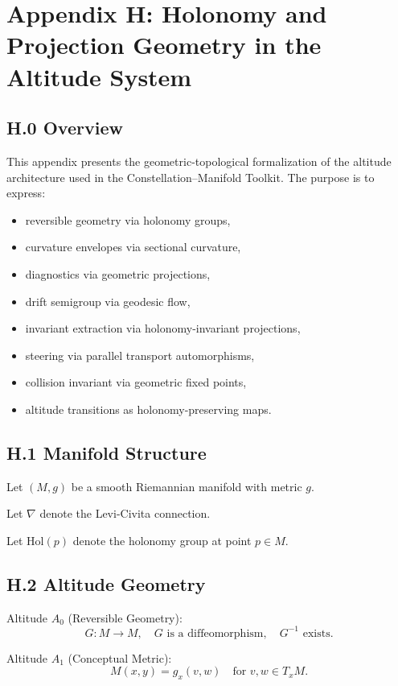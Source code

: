 \appendix
\section*{Appendix H: Holonomy and Projection Geometry in the Altitude System}

\subsection*{H.0 Overview}

This appendix presents the geometric-topological formalization of the
altitude architecture used in the Constellation–Manifold Toolkit.
The purpose is to express:
\begin{itemize}
    \item reversible geometry via holonomy groups,
    \item curvature envelopes via sectional curvature,
    \item diagnostics via geometric projections,
    \item drift semigroup via geodesic flow,
    \item invariant extraction via holonomy-invariant projections,
    \item steering via parallel transport automorphisms,
    \item collision invariant via geometric fixed points,
    \item altitude transitions as holonomy-preserving maps.
\end{itemize}

\subsection*{H.1 Manifold Structure}

Let $(M,g)$ be a smooth Riemannian manifold with metric $g$.

Let $\nabla$ denote the Levi-Civita connection.

Let $\mathrm{Hol}(p)$ denote the holonomy group at point $p \in M$.

\subsection*{H.2 Altitude Geometry}

Altitude $A_0$ (Reversible Geometry):
\[
G : M \to M,\quad G \text{ is a diffeomorphism},\quad G^{-1} \text{ exists}.
\]

Altitude $A_1$ (Conceptual Metric):
\[
M(x,y) = g_x(v,w) \quad \text{for } v,w \in T_x M.
\]

